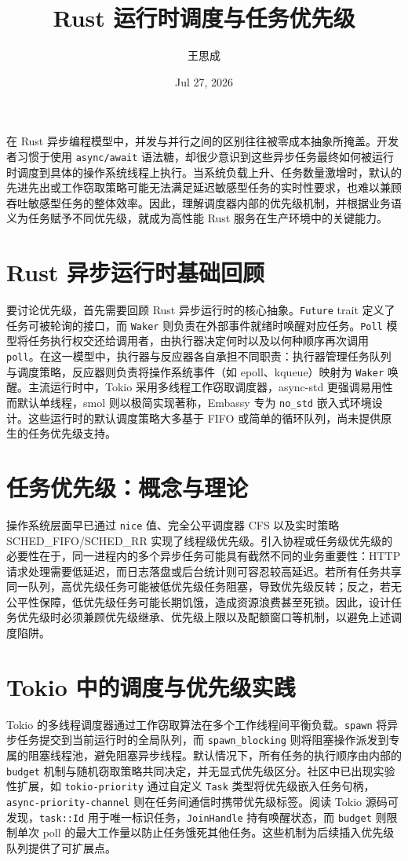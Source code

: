 \title{Rust 运行时调度与任务优先级}
\author{王思成}
\date{Jul 27, 2026}
\maketitle
在 Rust 异步编程模型中，并发与并行之间的区别往往被零成本抽象所掩盖。开发者习惯于使用 \texttt{async/await} 语法糖，却很少意识到这些异步任务最终如何被运行时调度到具体的操作系统线程上执行。当系统负载上升、任务数量激增时，默认的先进先出或工作窃取策略可能无法满足延迟敏感型任务的实时性要求，也难以兼顾吞吐敏感型任务的整体效率。因此，理解调度器内部的优先级机制，并根据业务语义为任务赋予不同优先级，就成为高性能 Rust 服务在生产环境中的关键能力。\par
\chapter{Rust 异步运行时基础回顾}
要讨论优先级，首先需要回顾 Rust 异步运行时的核心抽象。\texttt{Future} trait 定义了任务可被轮询的接口，而 \texttt{Waker} 则负责在外部事件就绪时唤醒对应任务。\texttt{Poll} 模型将任务执行权交还给调用者，由执行器决定何时以及以何种顺序再次调用 \texttt{poll}。在这一模型中，执行器与反应器各自承担不同职责：执行器管理任务队列与调度策略，反应器则负责将操作系统事件（如 epoll、kqueue）映射为 \texttt{Waker} 唤醒。主流运行时中，Tokio 采用多线程工作窃取调度器，async-std 更强调易用性而默认单线程，smol 则以极简实现著称，Embassy 专为 \texttt{no\_{}std} 嵌入式环境设计。这些运行时的默认调度策略大多基于 FIFO 或简单的循环队列，尚未提供原生的任务优先级支持。\par
\chapter{任务优先级：概念与理论}
操作系统层面早已通过 \texttt{nice} 值、完全公平调度器 CFS 以及实时策略 SCHED\_{}FIFO/SCHED\_{}RR 实现了线程级优先级。引入协程或任务级优先级的必要性在于，同一进程内的多个异步任务可能具有截然不同的业务重要性：HTTP 请求处理需要低延迟，而日志落盘或后台统计则可容忍较高延迟。若所有任务共享同一队列，高优先级任务可能被低优先级任务阻塞，导致优先级反转；反之，若无公平性保障，低优先级任务可能长期饥饿，造成资源浪费甚至死锁。因此，设计任务优先级时必须兼顾优先级继承、优先级上限以及配额窗口等机制，以避免上述调度陷阱。\par
\chapter{Tokio 中的调度与优先级实践}
Tokio 的多线程调度器通过工作窃取算法在多个工作线程间平衡负载。\texttt{spawn} 将异步任务提交到当前运行时的全局队列，而 \texttt{spawn\_{}blocking} 则将阻塞操作派发到专属的阻塞线程池，避免阻塞异步线程。默认情况下，所有任务的执行顺序由内部的 \texttt{budget} 机制与随机窃取策略共同决定，并无显式优先级区分。社区中已出现实验性扩展，如 \texttt{tokio-priority} 通过自定义 \texttt{Task} 类型将优先级嵌入任务句柄，\texttt{async-priority-channel} 则在任务间通信时携带优先级标签。阅读 Tokio 源码可发现，\texttt{task::Id} 用于唯一标识任务，\texttt{JoinHandle} 持有唤醒状态，而 \texttt{budget} 则限制单次 poll 的最大工作量以防止任务饿死其他任务。这些机制为后续插入优先级队列提供了可扩展点。\par

